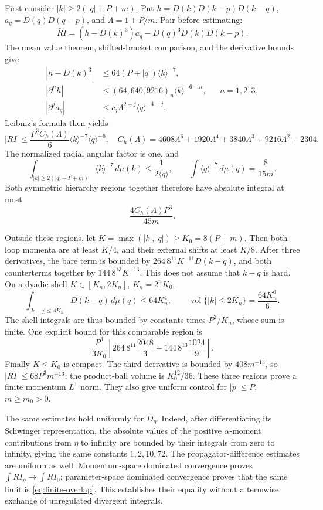 First consider \(|k|\geq2(|q|+P+m)\). Put
\(h=D(k)D(k-p)D(k-q)\), \(a_q=D(q)D(q-p)\), and
\(\Lambda=1+P/m\). Pair before estimating:
\[
 \bar R I=(h-D(k)^3)a_q-D(q)^3D(k)D(k-p).
\]
The mean value theorem, shifted-bracket comparison, and the derivative bounds
give
\begin{align}
 |h-D(k)^3|&\leq64(P+|q|)\langle k\rangle^{-7},\\
 |\partial^nh|&\leq(64,640,9216)_n\langle k\rangle^{-6-n},
       && n=1,2,3,\\
 |\partial^ja_q|&\leq c_j\Lambda^{2+j}\langle q\rangle^{-4-j}.
\end{align}
Leibniz's formula then yields
\[
 |RI|\leq\frac{P^3C_h(\Lambda)}6
        \langle k\rangle^{-7}\langle q\rangle^{-6},
 \quad
 C_h(\Lambda)=4608\Lambda^6+1920\Lambda^4+3840\Lambda^3
                  +9216\Lambda^2+2304.
\]
The normalized radial angular factor is one, and
\[
 \int_{|k|\geq2(|q|+P+m)}\langle k\rangle^{-7}\,d\mu(k)
 \leq\frac1{2\langle q\rangle},\qquad
 \int\langle q\rangle^{-7}\,d\mu(q)=\frac8{15m}.
\]
Both symmetric hierarchy regions together therefore have absolute integral
at most
\[\frac{4C_h(\Lambda)P^3}{45m}.\]

Outside these regions, let \(K=\max(|k|,|q|)\geq K_0=8(P+m)\).
Then both loop momenta are at least \(K/4\), and their external shifts at
least \(K/8\). After three derivatives, the bare term is bounded by
\(264\,8^{11}K^{-11}D(k-q)\), and both counterterms together by
\(144\,8^{13}K^{-13}\). This does not assume that \(k-q\) is hard.
On a dyadic shell \(K\in[K_n,2K_n]\), \(K_n=2^nK_0\),
\[
 \int_{|k-q|\leq4K_n}D(k-q)\,d\mu(q)\leq64K_n^4,
 \qquad\operatorname{vol}\{|k|\leq2K_n\}=\frac{64K_n^6}{6}.
\]
The shell integrals are thus bounded by constants times \(P^3/K_n\), whose
sum is finite. One explicit bound for this comparable region is
\[
 \frac{P^3}{3K_0}
 \left[264\,8^{11}\frac{2048}{3}
              +144\,8^{13}\frac{1024}{9}\right].
\]
Finally \(K\leq K_0\) is compact. The third derivative is bounded by
\(408m^{-13}\), so \(|RI|\leq68P^3m^{-13}\); the product-ball volume is
\(K_0^{12}/36\). These three regions prove a finite momentum \(L^1\) norm.
They also give uniform control for \(|p|\leq P\), \(m\geq m_0>0\).

The same estimates hold uniformly for \(D_\eta\). Indeed, after differentiating
its Schwinger representation, the absolute values of the positive
\(\alpha\)-moment contributions from \(\eta\) to infinity are bounded by
their integrals from zero to infinity, giving the same constants
\(1,2,10,72\). The propagator-difference estimates are uniform as well.
Momentum-space dominated convergence proves
\(\int RI_\eta\to\int RI_0\); parameter-space dominated convergence proves
that the same limit is \eqref{eq:finite-overlap}. This establishes their
equality without a termwise exchange of unregulated divergent integrals.

